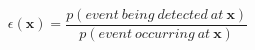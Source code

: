 \documentclass[preview, convert={density=300,size=1080x800,outext=.png}]{standalone}
\begin{document}
\begin{equation*}
    \epsilon(\boldsymbol{x}) = \frac{p(event\ being\ detected\ at\ \boldsymbol{x})}{p(event\ occurring\ at\ \boldsymbol{x})}
\end{equation*}
\end{document}
